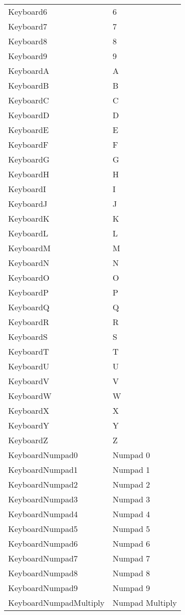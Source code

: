 \begin{center}
\begin{longtable}{ | l | p{10cm} |}
	Keyboard6				&	6\\
	Keyboard7				&	7\\
	Keyboard8				&	8\\
	Keyboard9				&	9\\
	KeyboardA				&	A\\
	KeyboardB				&	B\\
	KeyboardC				&	C\\
	KeyboardD				&	D\\
	KeyboardE				&	E\\
	KeyboardF				&	F\\
	KeyboardG				&	G\\
	KeyboardH				&	H\\
	KeyboardI				&	I\\
	KeyboardJ				&	J\\
	KeyboardK				&	K\\
	KeyboardL				&	L\\
	KeyboardM				&	M\\
	KeyboardN				&	N\\
	KeyboardO				&	O\\
	KeyboardP				&	P\\
	KeyboardQ				&	Q\\
	KeyboardR				&	R\\
	KeyboardS				&	S\\
	KeyboardT				&	T\\
	KeyboardU				&	U\\
	KeyboardV				&	V\\
	KeyboardW				&	W\\
	KeyboardX				&	X\\
	KeyboardY				&	Y\\
	KeyboardZ				&	Z\\
	KeyboardNumpad0			&	Numpad 0\\
	KeyboardNumpad1			&	Numpad 1\\
	KeyboardNumpad2			&	Numpad 2\\
	KeyboardNumpad3			&	Numpad 3\\
	KeyboardNumpad4			&	Numpad 4\\
	KeyboardNumpad5			&	Numpad 5\\
	KeyboardNumpad6			&	Numpad 6\\
	KeyboardNumpad7			&	Numpad 7\\
	KeyboardNumpad8			&	Numpad 8\\
	KeyboardNumpad9			&	Numpad 9\\
	KeyboardNumpadMultiply	&	Numpad Multiply\\

\end{longtable}
\end{center}
